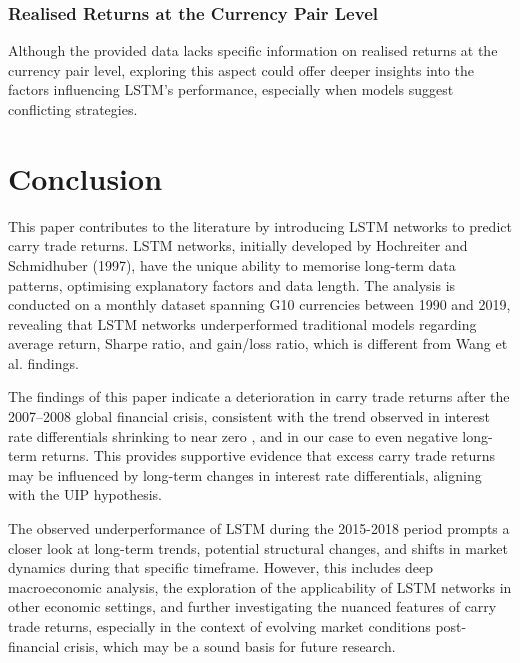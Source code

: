 \documentclass[a4paper,10pt]{article}
\begin{document}
\subsubsection{Realised Returns at the Currency Pair Level}

Although the provided data lacks specific information on realised returns at the currency pair level, exploring this aspect could offer deeper insights into the factors influencing LSTM's performance, especially when models suggest conflicting strategies.

\section{Conclusion}

This paper contributes to the literature by introducing LSTM networks to predict carry trade returns. LSTM networks, initially developed by Hochreiter and Schmidhuber (1997), have the unique ability to memorise long-term data patterns, optimising explanatory factors and data length. The analysis is conducted on a monthly dataset spanning G10 currencies between 1990 and 2019, revealing that LSTM networks underperformed traditional models regarding average return, Sharpe ratio, and gain/loss ratio, which is different from Wang et al. findings.

The findings of this paper indicate a deterioration in carry trade returns after the 2007–2008 global financial crisis, consistent with the trend observed in interest rate differentials shrinking to near zero \cite{accominotti2019currency}, and in our case to even negative long-term returns. This provides supportive evidence that excess carry trade returns may be influenced by long-term changes in interest rate differentials, aligning with the UIP hypothesis.

The observed underperformance of LSTM during the 2015-2018 period prompts a closer look at long-term trends, potential structural changes, and shifts in market dynamics during that specific timeframe. However, this includes deep macroeconomic analysis, the exploration of the applicability of LSTM networks in other economic settings, and further investigating the nuanced features of carry trade returns, especially in the context of evolving market conditions post-financial crisis, which may be a sound basis for future research.




\appendix
\end{document}
